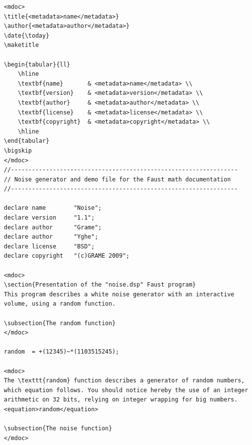 \documentclass[a4paper,10pt]{book}
\begin{document}
\footnotesize
\begin{lstlisting}
<mdoc>
\title{<metadata>name</metadata>}
\author{<metadata>author</metadata>}
\date{\today}
\maketitle

\begin{tabular}{ll}
	\hline
	\textbf{name}		& <metadata>name</metadata> \\
	\textbf{version} 	& <metadata>version</metadata> \\
	\textbf{author} 	& <metadata>author</metadata> \\
	\textbf{license} 	& <metadata>license</metadata> \\
	\textbf{copyright} 	& <metadata>copyright</metadata> \\
	\hline
\end{tabular}
\bigskip
</mdoc>
//-----------------------------------------------------------------
// Noise generator and demo file for the Faust math documentation
//-----------------------------------------------------------------

declare name 		"Noise";
declare version 	"1.1";
declare author 		"Grame";
declare author 		"Yghe";
declare license 	"BSD";
declare copyright 	"(c)GRAME 2009";

<mdoc>
\section{Presentation of the "noise.dsp" Faust program}
This program describes a white noise generator with an interactive volume, using a random function.

\subsection{The random function}
</mdoc>

random  = +(12345)~*(1103515245);

<mdoc>
The \texttt{random} function describes a generator of random numbers, which equation follows. You should notice hereby the use of an integer arithmetic on 32 bits, relying on integer wrapping for big numbers.
<equation>random</equation>

\subsection{The noise function}
</mdoc>


\end{lstlisting}
\end{document}
